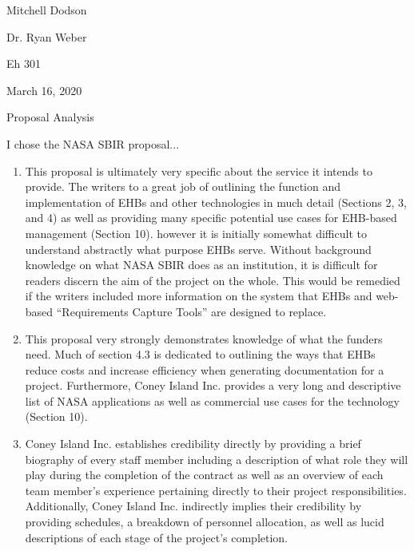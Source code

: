 \documentclass[11pt]{article}
\begin{document}
Mitchell Dodson

Dr. Ryan Weber %

Eh 301 %

March 16, 2020 %

\begin{center}\Large
Proposal Analysis
\end{center}

I chose the NASA SBIR proposal...

\begin{enumerate}

	\item{This proposal is ultimately very specific about the service it intends to provide. The writers to a great job of outlining the function and implementation of EHBs and other technologies in much detail (Sections 2, 3, and 4) as well as providing many specific potential use cases for EHB-based management (Section 10). however it is initially somewhat difficult to understand abstractly what purpose EHBs serve. Without background knowledge on what NASA SBIR does as an institution, it is difficult for readers discern the aim of the project on the whole. This would be remedied if the writers included more information on the system that EHBs and web-based ``Requirements Capture Tools'' are designed to replace.}

	\item{This proposal very strongly demonstrates knowledge of what the funders need. Much of section 4.3 is dedicated to outlining the ways that EHBs reduce costs and increase efficiency when generating documentation for a project. Furthermore, Coney Island Inc. provides a very long and descriptive list of NASA applications as well as commercial use cases for the technology (Section 10).}

	\item{Coney Island Inc. establishes credibility directly by providing a brief biography of every staff member including a description of what role they will play during the completion of the contract as well as an overview of each team member's experience pertaining directly to their project responsibilities. Additionally, Coney Island Inc. indirectly implies their credibility by providing schedules, a breakdown of personnel allocation, as well as lucid descriptions of each stage of the project's completion.}

\end{enumerate}

\printbibliography
\end{document}
